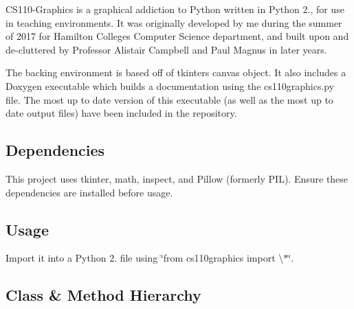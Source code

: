 C\+S110-\/\+Graphics is a graphical addiction to Python written in Python 2., for use in teaching environments. It was originally developed by me during the summer of 2017 for Hamilton College\textquotesingle{}s Computer Science department, and built upon and de-\/cluttered by Professor Alistair Campbell and Paul Magnus in later years.

The backing environment is based off of tkinter\textquotesingle{}s canvas object. It also includes a Doxygen executable which builds a documentation using the cs110graphics.\+py file. The most up to date version of this executable (as well as the most up to date output files) have been included in the repository.

\subsection*{Dependencies}

This project uses tkinter, math, inspect, and Pillow (formerly P\+IL). Ensure these dependencies are installed before usage.

\subsection*{Usage}

Import it into a Python 2. file using \char`\"{}from cs110graphics import \textbackslash{}$\ast$\char`\"{}.

\subsection*{Class \& Method Hierarchy}



